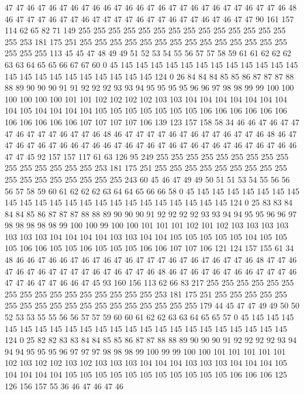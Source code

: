 47 47 46 47 46 47 46 47 46 46 47 46 46 47 46 47 47 46 47 46
47 47 46 47 47 46 48 46 47 47 47 46 47 47 46 47 47 47 47 46
47 47 46 47 47 46 47 46 47 47 90 161 157 114 62 65 82 71 149 255
255 255 255 255 255 255 255 255 255 255 255 255 255 255 253 181 175 251 255 255
255 255 255 255 255 255 255 255 255 255 255 255 255 255 255 113 45 45 47 48
49 49 51 52 53 54 55 56 57 57 58 59 61 61 62 62 62 63 63 64
65 65 66 67 67 60 0 45 145 145 145 145 145 145 145 145 145 145 145 145
145 145 145 145 145 145 145 145 145 145 124 0 26 84 84 84 85 85 86 87
87 87 88 88 89 90 90 90 91 91 92 92 92 93 93 94 95 95 95 95
96 96 97 98 98 99 99 100 100 100 100 100 100 101 101 102 102 102 102 103
103 104 104 104 104 104 104 104 104 105 104 104 104 104 105 105 105 105 105 105
105 106 106 106 106 106 106 106 106 106 106 106 107 107 107 107 106 139 123 157
158 58 34 46 46 47 46 47 47 47 46 47 47 47 46 47 47 46 48 46
47 47 47 47 46 47 46 47 47 46 47 47 46 48 46 47 47 46 47 46
47 46 46 47 46 46 47 46 47 46 47 46 47 46 47 46 47 46 47 46
47 46 46 47 47 45 92 157 157 117 61 63 126 95 249 255 255 255 255 255
255 255 255 255 255 255 255 255 255 255 253 181 175 251 255 255 255 255 255 255
255 255 255 255 255 255 255 255 255 255 255 243 60 45 46 47 49 49 50 51
51 53 54 55 56 56 56 57 58 59 60 61 62 62 62 63 64 64 65 66
66 58 0 45 145 145 145 145 145 145 145 145 145 145 145 145 145 145 145 145
145 145 145 145 145 145 124 0 25 83 83 84 84 84 85 86 87 87 87 88
88 89 90 90 90 91 92 92 92 92 93 93 94 94 95 95 96 96 97 98
98 98 98 98 99 100 100 99 100 100 101 101 101 102 101 102 103 103 103 103
103 103 103 104 104 104 104 103 103 104 104 105 105 105 105 105 104 105 105 105
106 106 105 105 106 105 105 105 106 106 107 107 106 121 124 157 155 61 34 48
46 46 47 46 46 47 46 47 46 47 46 47 47 47 46 47 46 47 46 47
47 46 48 47 47 46 47 46 47 46 47 47 47 47 46 47 46 47 47 46
48 46 47 46 47 46 47 46 46 47 47 47 46 47 47 46 47 47 46 46
47 45 93 160 156 113 62 66 83 217 255 255 255 255 255 255 255 255 255 255
255 255 255 255 255 255 253 181 175 251 255 255 255 255 255 255 255 255 255 255
255 255 255 255 255 255 255 255 179 44 45 47 47 49 49 50 50 52 53 53
55 55 56 56 57 57 59 60 60 61 62 62 63 63 64 65 65 57 0 45
145 145 145 145 145 145 145 145 145 145 145 145 145 145 145 145 145 145 145 145
145 145 124 0 25 82 82 83 83 84 84 85 85 86 87 87 88 88 89 90
90 90 91 92 92 92 92 93 94 94 94 95 95 95 96 97 97 97 98 98
98 99 100 99 99 100 100 101 101 101 101 101 102 103 102 102 103 102 103 103
103 104 104 104 103 103 103 104 104 104 105 104 104 104 104 105 105 105 105 105
105 105 105 105 105 105 106 106 106 125 126 156 157 55 36 46 47 46 47 46
